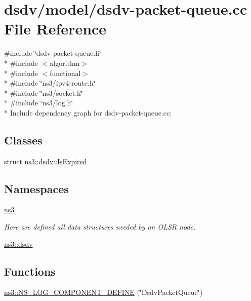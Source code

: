 \hypertarget{dsdv-packet-queue_8cc}{}\section{dsdv/model/dsdv-\/packet-\/queue.cc File Reference}
\label{dsdv-packet-queue_8cc}
{\ttfamily \#include \char`\"{}dsdv-\/packet-\/queue.\+h\char`\"{}}\\*
{\ttfamily \#include $<$algorithm$>$}\\*
{\ttfamily \#include $<$functional$>$}\\*
{\ttfamily \#include \char`\"{}ns3/ipv4-\/route.\+h\char`\"{}}\\*
{\ttfamily \#include \char`\"{}ns3/socket.\+h\char`\"{}}\\*
{\ttfamily \#include \char`\"{}ns3/log.\+h\char`\"{}}\\*
Include dependency graph for dsdv-\/packet-\/queue.cc\+:
\subsection*{Classes}
\begin{DoxyCompactItemize}
\item 
struct \hyperlink{structns3_1_1dsdv_1_1IsExpired}{ns3\+::dsdv\+::\+Is\+Expired}
\end{DoxyCompactItemize}
\subsection*{Namespaces}
\begin{DoxyCompactItemize}
\item 
 \hyperlink{namespacens3}{ns3}
\begin{DoxyCompactList}\small\item\em Here are defined all data structures needed by an O\+L\+SR node. \end{DoxyCompactList}\item 
 \hyperlink{namespacens3_1_1dsdv}{ns3\+::dsdv}
\end{DoxyCompactItemize}
\subsection*{Functions}
\begin{DoxyCompactItemize}
\item 
\hyperlink{namespacens3_a35aa5ece32e038216cc31eb50740e756}{ns3\+::\+N\+S\+\_\+\+L\+O\+G\+\_\+\+C\+O\+M\+P\+O\+N\+E\+N\+T\+\_\+\+D\+E\+F\+I\+NE} (\char`\"{}Dsdv\+Packet\+Queue\char`\"{})
\end{DoxyCompactItemize}
